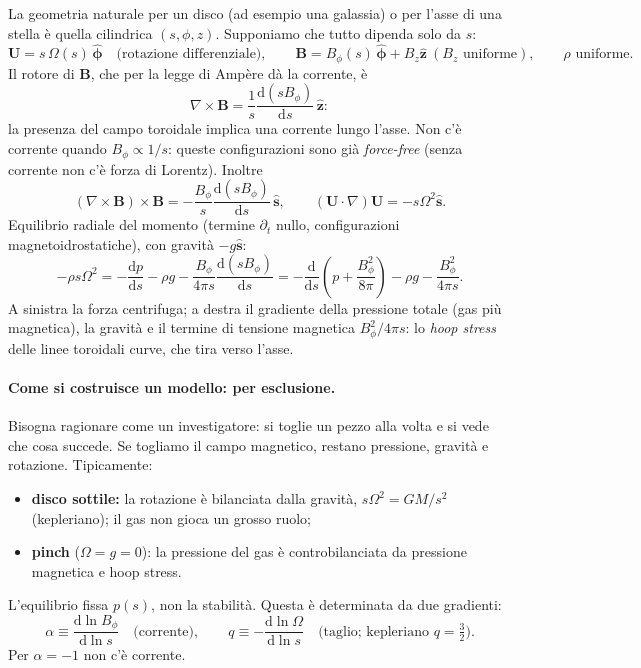 La geometria naturale per un disco (ad esempio una galassia) o per l'asse di una stella è quella cilindrica $(s,\phi,z)$. Supponiamo che tutto dipenda solo da $s$:
\begin{equation}
\mathbf{U}=s\,\Omega(s)\,\hat{\boldsymbol{\phi}}\quad\text{(rotazione differenziale)},\qquad
\mathbf{B}=B_\phi(s)\,\hat{\boldsymbol{\phi}}+B_z\hat{\mathbf{z}}\ (B_z\text{ uniforme}),\qquad\rho\text{ uniforme}.
\end{equation}
Il rotore di $\mathbf{B}$, che per la legge di Ampère dà la corrente, è
\begin{equation}
\nabla\times\mathbf{B}=\frac1s\frac{\mathrm{d}(sB_\phi)}{\mathrm{d}s}\,\hat{\mathbf{z}}:
\end{equation}
la presenza del campo toroidale implica una corrente lungo l'asse. Non c'è corrente quando $B_\phi\propto1/s$: queste configurazioni sono già \emph{force-free} (senza corrente non c'è forza di Lorentz). Inoltre
\begin{equation}
(\nabla\times\mathbf{B})\times\mathbf{B}=-\frac{B_\phi}{s}\frac{\mathrm{d}(sB_\phi)}{\mathrm{d}s}\,\hat{\mathbf{s}},\qquad(\mathbf{U}\cdot\nabla)\mathbf{U}=-s\Omega^2\hat{\mathbf{s}}.
\end{equation}
Equilibrio radiale del momento (termine $\partial_t$ nullo, configurazioni magnetoidrostatiche), con gravità $-g\hat{\mathbf{s}}$:
\begin{equation}
-\rho s\Omega^2=-\frac{\mathrm{d}p}{\mathrm{d}s}-\rho g-\frac{B_\phi}{4\pi s}\frac{\mathrm{d}(sB_\phi)}{\mathrm{d}s}
=-\frac{\mathrm{d}}{\mathrm{d}s}\left(p+\frac{B_\phi^2}{8\pi}\right)-\rho g-\frac{B_\phi^2}{4\pi s}.
\end{equation}
A sinistra la forza centrifuga; a destra il gradiente della pressione totale (gas più magnetica), la gravità e il termine di tensione magnetica $B_\phi^2/4\pi s$: lo \emph{hoop stress} delle linee toroidali curve, che tira verso l'asse.

\paragraph{Come si costruisce un modello: per esclusione.} Bisogna ragionare come un investigatore: si toglie un pezzo alla volta e si vede che cosa succede. Se togliamo il campo magnetico, restano pressione, gravità e rotazione. Tipicamente:
\begin{itemize}
\item \textbf{disco sottile:} la rotazione è bilanciata dalla gravità, $s\Omega^2=GM/s^2$ (kepleriano); il gas non gioca un grosso ruolo;
\item \textbf{pinch} ($\Omega=g=0$): la pressione del gas è controbilanciata da pressione magnetica e hoop stress.
\end{itemize}
L'equilibrio fissa $p(s)$, non la stabilità. Questa è determinata da due gradienti:
\begin{equation}
\alpha\equiv\frac{\mathrm{d}\ln B_\phi}{\mathrm{d}\ln s}\quad\text{(corrente)},\qquad
q\equiv-\frac{\mathrm{d}\ln\Omega}{\mathrm{d}\ln s}\quad\text{(taglio; kepleriano }q=\tfrac32).
\end{equation}
Per $\alpha=-1$ non c'è corrente.


